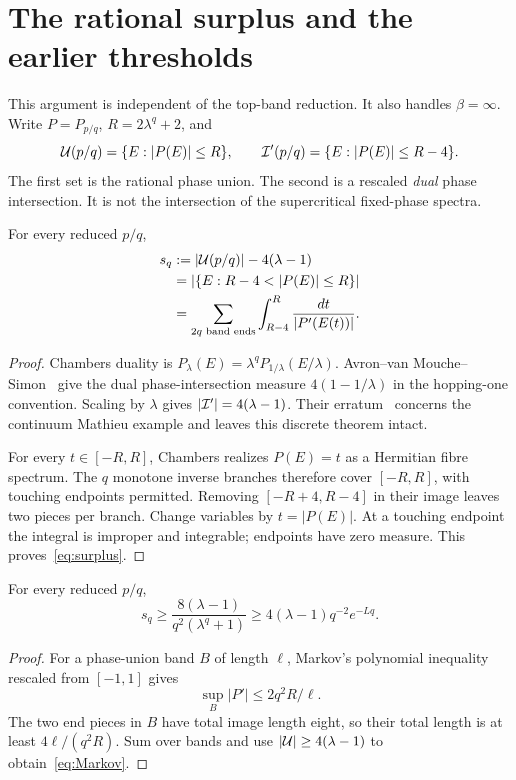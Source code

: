\section{The rational surplus and the earlier thresholds}\label{sec:surplus}
This argument is independent of the top-band reduction. It also handles $\beta=\infty$. Write $P=P_{p/q}$, $R=2\lambda^q+2$, and
\[
 \mathcal U(p/q)=\{E:|P(E)|\le R\},\qquad
 \mathcal I'(p/q)=\{E:|P(E)|\le R-4\}.
\]
The first set is the rational phase union. The second is a rescaled \emph{dual} phase intersection. It is not the intersection of the supercritical fixed-phase spectra.

\begin{inputbox}
\begin{classicalidentity}
For every reduced $p/q$,
\begin{align}
 s_q&:=|\cU(p/q)|-4(\lambda-1)\notag\\
 &=|\{E:R-4<|P(E)|\le R\}|\notag\\
 &=\sum_{\text{$2q$ band ends}}
       \int_{R-4}^{R}\frac{dt}{|P'(E(t))|}.\label{eq:surplus}
\end{align}
\end{classicalidentity}
\end{inputbox}
\begin{proof}
Chambers duality is $P_\lambda(E)=\lambda^qP_{1/\lambda}(E/\lambda)$. Avron--van Mouche--Simon~\cite[Theorem~1]{AvMS} give the dual phase-intersection measure $4(1-1/\lambda)$ in the hopping-one convention. Scaling by $\lambda$ gives $|\mathcal I'|=4(\lambda-1)$. Their erratum~\cite{AvMSerratum} concerns the continuum Mathieu example and leaves this discrete theorem intact.

For every $t\in[-R,R]$, Chambers realizes $P(E)=t$ as a Hermitian fibre spectrum. The $q$ monotone inverse branches therefore cover $[-R,R]$, with touching endpoints permitted. Removing $[-R+4,R-4]$ in their image leaves two pieces per branch. Change variables by $t=|P(E)|$. At a touching endpoint the integral is improper and integrable; endpoints have zero measure. This proves~\eqref{eq:surplus}.
\end{proof}

\begin{proposition}\label{prop:surplus}
For every reduced $p/q$,
\begin{equation}\label{eq:Markov}
 s_q\ge\frac{8(\lambda-1)}{q^2(\lambda^q+1)}
       \ge4(\lambda-1)q^{-2}e^{-Lq}.
\end{equation}
\end{proposition}
\begin{proof}
For a phase-union band $B$ of length $\ell$, Markov's polynomial inequality rescaled from $[-1,1]$ gives
\[
 \sup_B|P'|\le 2q^2R/\ell.
\]
The two end pieces in $B$ have total image length eight, so their total length is at least $4\ell/(q^2R)$. Sum over bands and use $|\mathcal U|\ge4(\lambda-1)$ to obtain~\eqref{eq:Markov}.
\end{proof}


